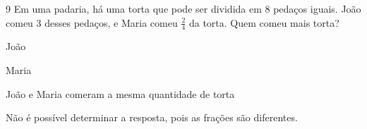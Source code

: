 





\num{9} Em uma padaria, há uma torta que pode ser dividida em 8 pedaços
iguais. João comeu 3 desses pedaços, e Maria comeu $\frac{2}{4}$ da torta. Quem
comeu mais torta?

\begin{escolha}
\item João
\item Maria
\item João e Maria comeram a mesma quantidade de torta
\item Não é possível determinar a resposta, pois as frações são diferentes.
\end{escolha}







